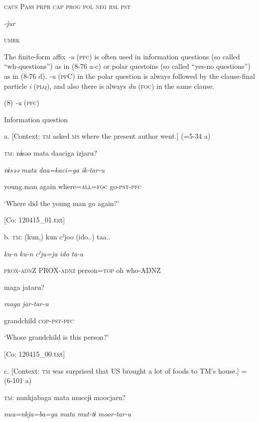     \textsc{caus}  P\textsc{ass}  \textsc{prpr}  \textsc{cap}  \textsc{prog}  \textsc{pol}  \textsc{neg}  \textsc{rsl}  \textsc{pst}

          \textit{{}-jur} 

          \textsc{umrk}

The finite-form affix \textit{{}-u} (\textsc{pfc}) is often used in information questions (so called “wh-questions”) as in (8-76 a-c) or polar questoins (so called “yes-no questions”) as in (8-76 d). \textit{{}-u} (\textsc{pf}C) in the polar question is always followed by the clause-final particle \textit{i} (\textsc{plq}), and also there is always \textit{du} (\textsc{foc}) in the same clause.

(8)  \textit{{}-u} (\textsc{pfc})

  Information question

  a.  [Context: \textsc{tm} asked \textsc{ms} where the present author went.] (=5-34 a)

    \textsc{tm}:  nɨsəə  mata  daaciga  izjaru?

      \textit{nɨsəə}  \textit{mata}  \textit{daa=kaci=ga}  \textit{ik-tar-u}

      young.man  again  where=\textsc{all}=\textsc{foc}  go-\textsc{pst}-\textsc{pfc}

      ‘Where did the young man go again?’

      [Co: 120415\_01.txt]

  b.  \textsc{tm}:  (kun,)  kun  cˀjoo  (ido..)  taa..

      \textit{ku-n}  \textit{ku-n}  \textit{cˀju=ja}  \textit{ido}  \textit{ta-a}

      \textsc{prox}-\textsc{adn}Z  PROX-\textsc{adnz}  person=\textsc{top}  oh  who-ADNZ

      maga  jataru?      

      \textit{maga}  \textit{jar-tar-u}      

      grandchild  \textsc{cop}-\textsc{pst}-\textsc{pfc}

      ‘Whose grandchild is this person?’

      [Co: 120415\_00.txt]

  c.  [Context: \textsc{tm} was surprised that US brought a lot of foods to TM’s house.] = (6-101 a)

    \textsc{tm}:  nunkjabaga  mata  muccjɨ  moocjaru?

      \textit{nuu=nkja=ba=ga}  \textit{mata}  \textit{mut-tɨ}  \textit{moor-tar-u}

